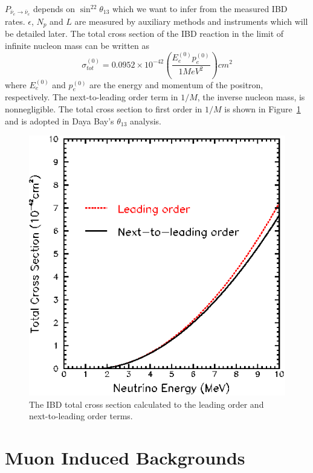 $P_{\bar{\nu}_e\rightarrow\bar{\nu}_e}$ depends on $\sin^22\theta_{13}$ which we want to infer from the measured IBD rates. $\epsilon$, $N_p$ and $L$ are measured by auxiliary methods and instruments which will be detailed later. The total cross section of the IBD reaction in the limit of infinite nucleon mass can be written as~\cite{Vogel1999}
\begin{equation}
	\sigma^{(0)}_{tot}=0.0952\times 10^{-42} \left( \frac{E^{(0)}_ep^{(0)}_e}{1 MeV^2}\right) cm^2
\end{equation}
where $E^{(0)}_e$ and $p^{(0)}_e$ are the energy and momentum of the positron, respectively. The next-to-leading order term in $1/M$, the inverse nucleon mass, is nonnegligible. The total cross section to first order in $1/M$ is shown in Figure~\ref{fig:IBD_total_cross_section} and is adopted in Daya Bay's $\theta_{13}$ analysis.
\begin{figure}
	\centering
	\includegraphics[width=.4\textwidth]{figures/chap1/IBD_total_cross_section.eps}
	\caption{The IBD total cross section calculated to the leading order and next-to-leading order terms.}
	\label{fig:IBD_total_cross_section}
\end{figure}

\section{Muon Induced Backgrounds}

